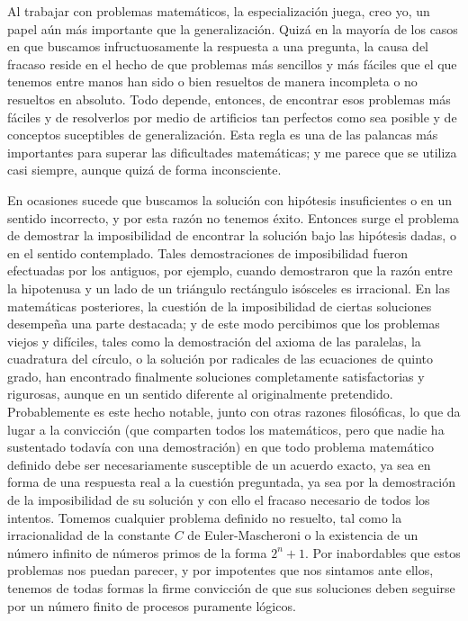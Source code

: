 \documentclass[a4paper, 12pt]{article}
\begin{document}
Al trabajar con problemas matemáticos, la especialización juega, creo yo, un papel aún más importante que la generalización. Quizá en la mayoría de los casos en que buscamos infructuosamente la respuesta a una pregunta, la causa del fracaso reside en el hecho de que problemas más sencillos y más fáciles que el que tenemos entre manos han sido o bien resueltos de manera incompleta o no resueltos en absoluto. Todo depende, entonces, de encontrar esos problemas más fáciles y de resolverlos por medio de artificios tan perfectos como sea posible y de conceptos suceptibles de generalización. Esta regla es una de las palancas más importantes para superar las dificultades matemáticas; y me parece que se utiliza casi siempre, aunque quizá de forma inconsciente.
 
En ocasiones sucede que buscamos la solución con hipótesis insuficientes o en un sentido incorrecto, y por esta razón no tenemos éxito. Entonces surge el problema de demostrar la imposibilidad de encontrar la solución bajo las hipótesis dadas, o en el sentido contemplado. Tales demostraciones de imposibilidad fueron efectuadas por los antiguos, por ejemplo, cuando demostraron que la razón entre la hipotenusa y un lado de un triángulo rectángulo isósceles es irracional. En las matemáticas posteriores, la cuestión de la imposibilidad de ciertas soluciones desempeña una parte destacada; y de este modo percibimos que los problemas viejos y difíciles, tales como la demostración del axioma de las paralelas, la cuadratura del círculo, o la solución por radicales de las ecuaciones de quinto grado, han encontrado finalmente soluciones completamente satisfactorias y rigurosas, aunque en un sentido diferente al originalmente pretendido. Probablemente es este hecho notable, junto con otras razones filosóficas, lo que da lugar a la convicción (que comparten todos los matemáticos, pero que nadie ha sustentado todavía con una demostración) en que todo problema matemático definido debe ser necesariamente susceptible de un acuerdo exacto, ya sea en forma de una respuesta real a la cuestión preguntada, ya sea por la demostración de la imposibilidad de su solución y con ello el fracaso necesario de todos los intentos. Tomemos cualquier problema definido no resuelto, tal como la irracionalidad de la constante $C$ de Euler-Mascheroni o la existencia de un número infinito de números primos de la forma $2^n + 1$. Por inabordables que estos problemas nos puedan parecer, y por impotentes que nos sintamos ante ellos, tenemos de todas formas la firme convicción de que sus soluciones deben seguirse por un número finito de procesos puramente lógicos. 
\end{document}
